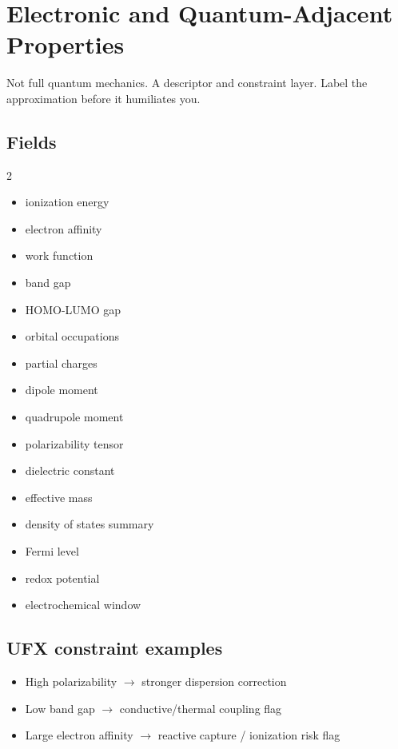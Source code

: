 \documentclass[11pt, a4paper]{article}
\begin{document}
\section{Electronic and Quantum-Adjacent Properties}

Not full quantum mechanics. A descriptor and constraint layer. Label the approximation before it humiliates you.

\subsection{Fields}

\begin{multicols}{2}
\begin{itemize}[itemsep=1pt, leftmargin=*]
  \item ionization energy
  \item electron affinity
  \item work function
  \item band gap
  \item HOMO-LUMO gap
  \item orbital occupations
  \item partial charges
  \item dipole moment
  \item quadrupole moment
  \item polarizability tensor
  \item dielectric constant
  \item effective mass
  \item density of states summary
  \item Fermi level
  \item redox potential
  \item electrochemical window
\end{itemize}
\end{multicols}

\subsection{UFX constraint examples}

\begin{itemize}[itemsep=1pt, leftmargin=*]
  \item High polarizability $\rightarrow$ stronger dispersion correction
  \item Low band gap $\rightarrow$ conductive/thermal coupling flag
  \item Large electron affinity $\rightarrow$ reactive capture / ionization risk flag
\end{itemize}
\end{document}
